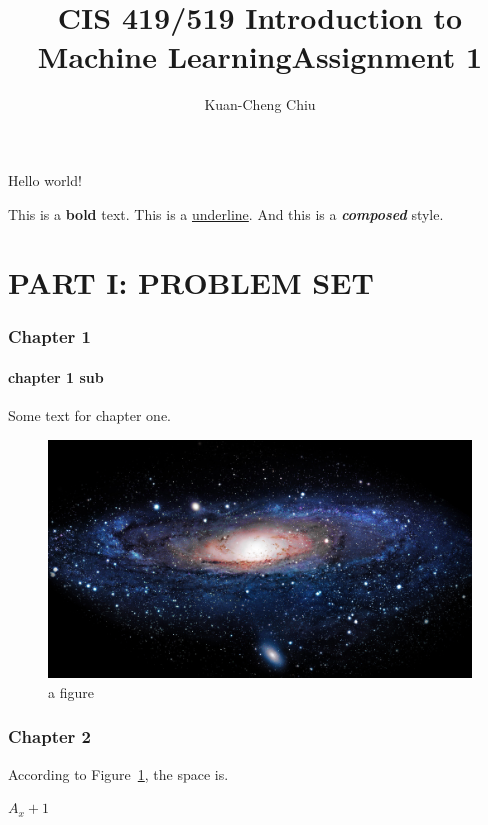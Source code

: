 \documentclass{article}
\title{CIS 419/519 Introduction to Machine Learning\newline Assignment 1}
\author{Kuan-Cheng Chiu}
\date{}
\begin{document}
\maketitle
 Hello world!

This is a \textbf{bold} text. This is a \underline{underline}. And this is a \textbf{\textit{composed}} style.

\part*{PART I: PROBLEM SET}

\section{Chapter 1}
\subsection{chapter 1 sub}
Some text for chapter one.

\begin{figure}[tbph]
	\centering
	\includegraphics[width=0.8\linewidth]{img}
	\caption{a figure}
	\label{fig:img}
\end{figure}


\section{Chapter 2}

According to Figure~\ref{fig:img}, the space is.



$A_{x}+1$
\end{document}
